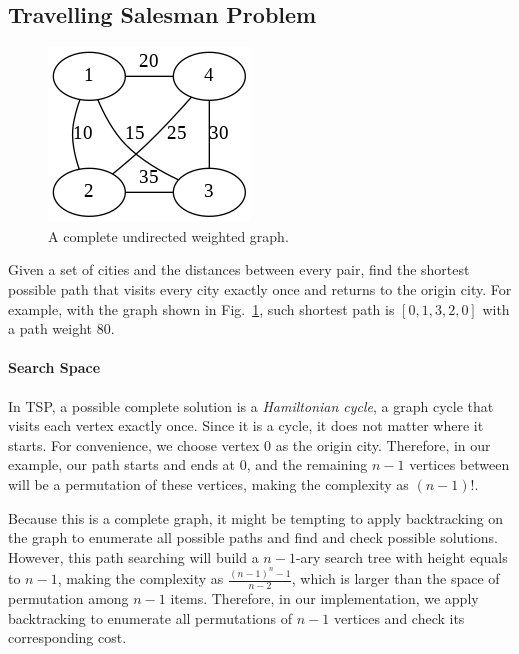 \documentclass[../main.tex]{subfiles}
\begin{document}
\subsection{Travelling Salesman Problem}
\begin{figure}[!ht]
    \centering
    \includegraphics[width= 0.4\columnwidth]{fig/tsp_graph.png}
    \caption{A complete undirected weighted graph.}
    \label{fig:tsp_graph}
\end{figure}
Given a set of cities and the distances between every pair, find the shortest possible path that visits every city exactly once and returns to the origin city. For example, with the graph shown in Fig.~\ref{fig:tsp_graph}, such shortest path is $[0, 1, 3, 2, 0]$ with a path weight $80$. 

\paragraph{Search Space} In TSP, a possible complete solution is a \textit{Hamiltonian cycle}, a graph cycle that visits each vertex exactly once. Since it is a cycle, it does not matter where it starts. For convenience, we choose vertex $0$ as the origin city. Therefore, in our example, our path starts and ends at $0$, and the remaining $n-1$ vertices between will  be a permutation of these vertices, making the complexity as $(n-1)!$. 

Because this is a complete graph, it might be tempting to apply backtracking on the graph to enumerate all possible paths and find and check possible solutions. However, this path searching will build a $n-1$-ary search tree with height equals to $n-1$, making the complexity as $\frac{(n-1)^{n}-1}{n-2}$, which is larger than the space of permutation among $n-1$ items. Therefore, in our implementation, we apply backtracking to enumerate all permutations of $n-1$ vertices and check its corresponding cost.  
\end{document}
